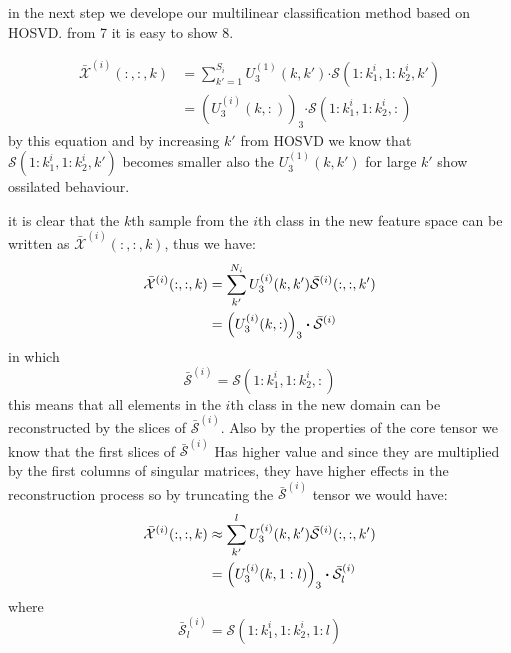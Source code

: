 \documentclass[journal]{IEEEtran}
\begin{document}
	in the next step we develope our multilinear classification method based on HOSVD. from 7 it is easy to show 8. 
	
	\begin{align*}
	\bar{{\mathcal{X}}}^{(i)}(:,:,k) &= \sum_{k' = 1}^{S_i} U_{3}^{(1)}(k,k') \boldsymbol{\cdot} \mathcal{S}(1:k_1^i, 1:k_2^i, k')\\
	&=\left(  
	U_3^{(i)}(k,:)
	\right)_{3} \boldsymbol{\cdot} \mathcal{S}(1:k_1^i, 1:k_2^i, :)
	\end{align*}
	by this equation and by increasing $k'$ from HOSVD we know that $\mathcal{S}(1:k_1^i, 1:k_2^i, k')$ becomes smaller also the $U_{3}^{(1)}(k,k')$ for large $k'$ show ossilated behaviour.
	
	
	it is clear that the $k$th sample from the $i$th class in the new feature space can be written as $\bar{\mathcal{X}}^{(i)}(:,:,k)$, thus we have:
	\begin{align}
	\bar{\mathcal{X}}^{(i)}(:,:,k) &= \sum_{k'}^{N_i} U_3^{(i)}(k,k')\bar{\mathcal{S}}^{(i)}(:,:,k') \notag
	\\&= \left( U_{3}^{(i)}(k,:)\right)_3 \boldsymbol{\cdot} \bar{\mathcal{S}}^{(i)}
	\end{align}
	in which 
	\[
	\bar{\mathcal{S}}^{(i)} = \mathcal{S}(1:k_1^i, 1:k_2^i, :)
	\]
	this means that all elements in the $i$th class in the new domain can be reconstructed by the slices of $\bar{\mathcal{S}}^{(i)}$. Also by the properties of the core tensor we know that the first slices of $\bar{\mathcal{S}}^{(i)}$ Has higher value and since they are multiplied by the first columns of singular matrices, they have higher effects in the reconstruction process so by truncating the $\bar{\mathcal{S}}^{(i)}$ tensor we would have: 
	\begin{align}
	\bar{\mathcal{X}}^{(i)}(:,:,k) &\approx \sum_{k'}^{l} U_3^{(i)}(k,k')\bar{\mathcal{S}}^{(i)}(:,:,k') \notag
	\\&
	= \left( U_{3}^{(i)}(k,1:l)\right)_3 \boldsymbol{\cdot} \bar{\mathcal{S}}^{(i)}_l \label{Basis} 
	\end{align} 
	where
	\[
	\bar{\mathcal{S}}^{(i)}_l = \mathcal{S}(1:k_1^i, 1:k_2^i, 1:l)
	\]
	
\end{document}
